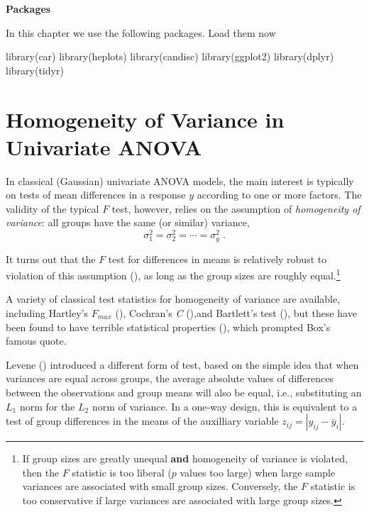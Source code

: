 \documentclass[
  letterpaper,
  10pt,
  krantz2]{krantz}
\makeatletter
\newenvironment{Shaded}{\begin{snugshade}}{\end{snugshade}}
\newcommand{\FunctionTok}[1]{\textcolor[rgb]{0.28,0.35,0.67}{#1}}
\newcommand{\NormalTok}[1]{\textcolor[rgb]{0.00,0.23,0.31}{#1}}
\newenvironment{kframe}{%
  \medskip{}
  \setlength{\fboxsep}{.8em}
  \def\at@end@of@kframe{}%
  \ifinner\ifhmode%
  \def\at@end@of@kframe{\end{minipage}}%
  \begin{minipage}{\columnwidth}%
  \fi\fi%
  \def\FrameCommand##1{\hskip\@totalleftmargin \hskip-\fboxsep
  \colorbox{shadecolor}{##1}\hskip-\fboxsep
      \hskip-\linewidth \hskip-\@totalleftmargin \hskip\columnwidth}%
  \MakeFramed {\advance\hsize-\width
    \@totalleftmargin\z@ \linewidth\hsize
    \@setminipage}}%
{\par\unskip\endMakeFramed%
  \at@end@of@kframe}
\renewenvironment{Shaded}{\begin{kframe}}{\end{kframe}}
\makeatother
\begin{document}
\textbf{Packages}

In this chapter we use the following packages. Load them now

\begin{Shaded}
\begin{Highlighting}[]
\FunctionTok{library}\NormalTok{(car)}
\FunctionTok{library}\NormalTok{(heplots)}
\FunctionTok{library}\NormalTok{(candisc)}
\FunctionTok{library}\NormalTok{(ggplot2)}
\FunctionTok{library}\NormalTok{(dplyr)}
\FunctionTok{library}\NormalTok{(tidyr)}
\end{Highlighting}
\end{Shaded}

\section{Homogeneity of Variance in Univariate
ANOVA}\label{sec-homogeneity-ANOVA}

In classical (Gaussian) univariate ANOVA models, the main interest is
typically on tests of mean differences in a response \(y\) according to
one or more factors. The validity of the typical \(F\) test, however,
relies on the assumption of \emph{homogeneity of variance}: all groups
have the same (or similar) variance, \[
\sigma_1^2 = \sigma_2^2 = \cdots = \sigma_g^2 \; .
\]

It turns out that the \(F\) test for differences in means is relatively
robust to violation of this assumption
(), as long as the
group sizes are roughly equal.\footnote{If group sizes are greatly
  unequal \textbf{and} homogeneity of variance is violated, then the
  \(F\) statistic is too liberal (\(p\) values too large) when large
  sample variances are associated with small group sizes. Conversely,
  the \(F\) statistic is too conservative if large variances are
  associated with large group sizes.}

A variety of classical test statistics for homogeneity of variance are
available, including Hartley's \(F_{max}\)
(), Cochran's \emph{C}
(),and Bartlett's test
(), but these have been
found to have terrible statistical properties
(), which prompted
Box's famous quote.

Levene () introduced a different form of
test, based on the simple idea that when variances are equal across
groups, the average absolute values of differences between the
observations and group means will also be equal, i.e., substituting an
\(L_1\) norm for the \(L_2\) norm of variance. In a one-way design, this
is equivalent to a test of group differences in the means of the
auxilliary variable \(z_{ij} = | y_{ij} - \bar{y}_i |\).
\end{document}
